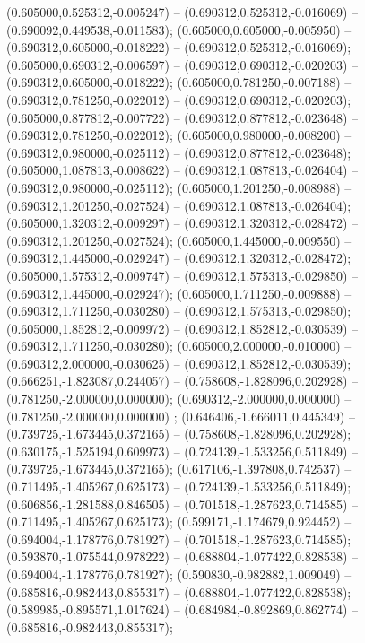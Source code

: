  (0.605000,0.525312,-0.005247) -- (0.690312,0.525312,-0.016069) -- (0.690092,0.449538,-0.011583);
 (0.605000,0.605000,-0.005950) -- (0.690312,0.605000,-0.018222) -- (0.690312,0.525312,-0.016069);
 (0.605000,0.690312,-0.006597) -- (0.690312,0.690312,-0.020203) -- (0.690312,0.605000,-0.018222);
 (0.605000,0.781250,-0.007188) -- (0.690312,0.781250,-0.022012) -- (0.690312,0.690312,-0.020203);
 (0.605000,0.877812,-0.007722) -- (0.690312,0.877812,-0.023648) -- (0.690312,0.781250,-0.022012);
 (0.605000,0.980000,-0.008200) -- (0.690312,0.980000,-0.025112) -- (0.690312,0.877812,-0.023648);
 (0.605000,1.087813,-0.008622) -- (0.690312,1.087813,-0.026404) -- (0.690312,0.980000,-0.025112);
 (0.605000,1.201250,-0.008988) -- (0.690312,1.201250,-0.027524) -- (0.690312,1.087813,-0.026404);
 (0.605000,1.320312,-0.009297) -- (0.690312,1.320312,-0.028472) -- (0.690312,1.201250,-0.027524);
 (0.605000,1.445000,-0.009550) -- (0.690312,1.445000,-0.029247) -- (0.690312,1.320312,-0.028472);
 (0.605000,1.575312,-0.009747) -- (0.690312,1.575313,-0.029850) -- (0.690312,1.445000,-0.029247);
 (0.605000,1.711250,-0.009888) -- (0.690312,1.711250,-0.030280) -- (0.690312,1.575313,-0.029850);
 (0.605000,1.852812,-0.009972) -- (0.690312,1.852812,-0.030539) -- (0.690312,1.711250,-0.030280);
 (0.605000,2.000000,-0.010000) -- (0.690312,2.000000,-0.030625) -- (0.690312,1.852812,-0.030539);
 (0.666251,-1.823087,0.244057) -- (0.758608,-1.828096,0.202928) -- (0.781250,-2.000000,0.000000);
 (0.690312,-2.000000,0.000000) -- (0.781250,-2.000000,0.000000) ;
 (0.646406,-1.666011,0.445349) -- (0.739725,-1.673445,0.372165) -- (0.758608,-1.828096,0.202928);
 (0.630175,-1.525194,0.609973) -- (0.724139,-1.533256,0.511849) -- (0.739725,-1.673445,0.372165);
 (0.617106,-1.397808,0.742537) -- (0.711495,-1.405267,0.625173) -- (0.724139,-1.533256,0.511849);
 (0.606856,-1.281588,0.846505) -- (0.701518,-1.287623,0.714585) -- (0.711495,-1.405267,0.625173);
 (0.599171,-1.174679,0.924452) -- (0.694004,-1.178776,0.781927) -- (0.701518,-1.287623,0.714585);
 (0.593870,-1.075544,0.978222) -- (0.688804,-1.077422,0.828538) -- (0.694004,-1.178776,0.781927);
 (0.590830,-0.982882,1.009049) -- (0.685816,-0.982443,0.855317) -- (0.688804,-1.077422,0.828538);
 (0.589985,-0.895571,1.017624) -- (0.684984,-0.892869,0.862774) -- (0.685816,-0.982443,0.855317);
